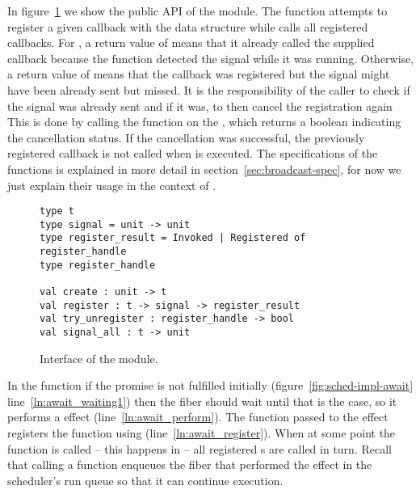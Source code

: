 In figure~\ref{fig:sched-impl-broadcast} we show the public API of the  module.
The  function attempts to register a given callback with the data structure while  calls all registered callbacks.
For , a return value of  means that it already called the supplied callback because the function detected the signal while it was running.
Otherwise, a return value of  means that the callback was registered but the signal might have been already sent but missed.
It is the responsibility of the caller to check if the signal was already sent and if it was, to then cancel the registration again
This is done by calling the  function on the , which returns a boolean indicating the cancellation status.
If the cancellation was successful, the previously registered callback is not called when  is executed.
The specifications of the functions is explained in more detail in section~\ref{sec:broadcast-spec}, for now we just explain their usage in the context of .

\begin{figure}[ht]
  \begin{verbatim}
type t
type signal = unit -> unit
type register_result = Invoked | Registered of register_handle
type register_handle

val create : unit -> t
val register : t -> signal -> register_result
val try_unregister : register_handle -> bool
val signal_all : t -> unit
  \end{verbatim}
  \caption{Interface of the  module.}
  \label{fig:sched-impl-broadcast}
\end{figure}

In the  function if the promise is not fulfilled initially (figure~\ref{fig:sched-impl-await} line~\ref{ln:await_waiting1})
then the fiber should wait until that is the case, so it performs a \esuspend{} effect (line~\ref{ln:await_perform}).
The  function passed to the effect registers the  function using  (line~\ref{ln:await_register}).
When at some point the  function is called -- this happens in  -- all registered s are called in turn.
Recall that calling a  function enqueues the fiber that performed the \esuspend{} effect in the scheduler's run queue so that it can continue execution.

